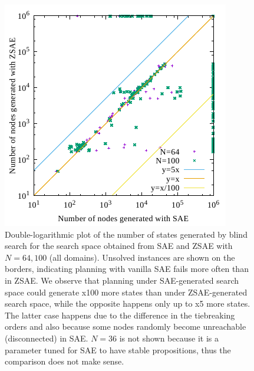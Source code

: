 \begin{figure}[htb]
 \centering
 \includegraphics{img/static/gen.pdf}
 \caption{Double-logarithmic plot of the number of states generated by blind search
for the search space obtained from SAE and ZSAE with $N=64,100$ (all domains). 
Unsolved instances are shown on the borders, indicating planning with vanilla SAE fails more often than in ZSAE.
We observe that planning under SAE-generated search space could generate x100 more states
than under ZSAE-generated search space, while the opposite happens only up to x5 more states.
The latter case happens due to the difference in the tiebreaking orders and also because some nodes randomly become unreachable (disconnected) in SAE.
$N=36$ is not shown because
it is a parameter tuned for SAE to have stable propositions, thus the comparison does not make sense.
}
 \label{fig:ama1-visited}
\end{figure}

% 
% 
% 

